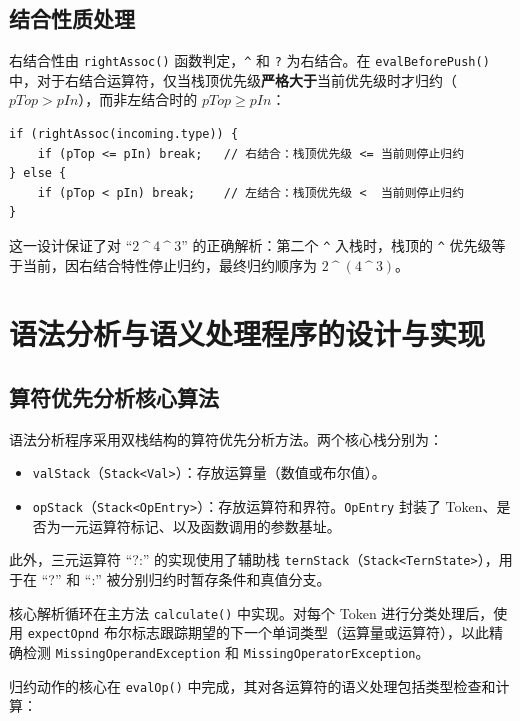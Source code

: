 \subsection{结合性质处理}

右结合性由 \texttt{rightAssoc()} 函数判定，\texttt{\^{}} 和 \texttt{?} 为右结合。在 \texttt{evalBeforePush()} 中，对于右结合运算符，仅当栈顶优先级\textbf{严格大于}当前优先级时才归约（$pTop > pIn$），而非左结合时的 $pTop \ge pIn$：

\begin{lstlisting}[style=cleanjava]
if (rightAssoc(incoming.type)) {
    if (pTop <= pIn) break;   // 右结合：栈顶优先级 <= 当前则停止归约
} else {
    if (pTop < pIn) break;    // 左结合：栈顶优先级 <  当前则停止归约
}
\end{lstlisting}

这一设计保证了对 ``$2\ \^{}\ 4\ \^{}\ 3$'' 的正确解析：第二个 \texttt{\^{}} 入栈时，栈顶的 \texttt{\^{}} 优先级等于当前，因右结合特性停止归约，最终归约顺序为 $2\ \^{}\ (4\ \^{}\ 3)$。

\section{语法分析与语义处理程序的设计与实现}

\subsection{算符优先分析核心算法}

语法分析程序采用双栈结构的算符优先分析方法。两个核心栈分别为：
\begin{itemize}
    \item \texttt{valStack}（\texttt{Stack<Val>}）：存放运算量（数值或布尔值）。
    \item \texttt{opStack}（\texttt{Stack<OpEntry>}）：存放运算符和界符。\texttt{OpEntry} 封装了 Token、是否为一元运算符标记、以及函数调用的参数基址。
\end{itemize}

此外，三元运算符 ``?:'' 的实现使用了辅助栈 \texttt{ternStack}（\texttt{Stack<TernState>}），用于在 ``?'' 和 ``:'' 被分别归约时暂存条件和真值分支。

核心解析循环在主方法 \texttt{calculate()} 中实现。对每个 Token 进行分类处理后，使用 \texttt{expectOpnd} 布尔标志跟踪期望的下一个单词类型（运算量或运算符），以此精确检测 \texttt{MissingOperandException} 和 \texttt{MissingOperatorException}。

归约动作的核心在 \texttt{evalOp()} 中完成，其对各运算符的语义处理包括类型检查和计算：

